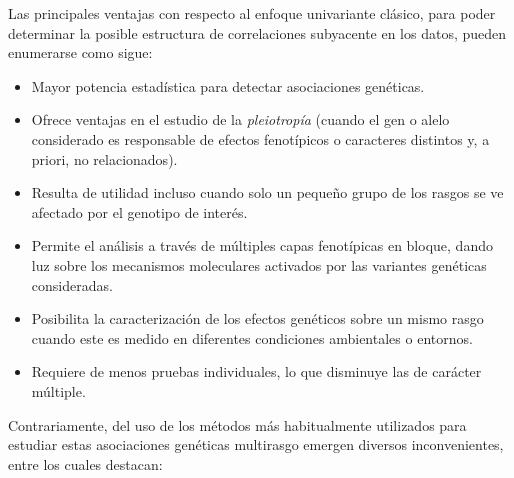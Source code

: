\documentclass[IB,BIB]{TFUOC}%
\let\oldgls=\gls
\renewcommand{\gls}[1]{{\hypersetup{linkcolor=[RGB]{0,0,0}}
  \oldgls{#1}}}
\begin{document}
Las principales ventajas con respecto al enfoque univariante clásico, para poder determinar la posible estructura de correlaciones subyacente en los datos, pueden enumerarse como sigue:

{\small
\begin{itemize}
    \item Mayor potencia estadística para detectar asociaciones genéticas.
    \item Ofrece ventajas en el estudio de la \hspace{-.25em}\textit{\gls{pleiotropía}} (cuando el gen o alelo considerado es responsable de efectos fenotípicos o caracteres distintos y, a priori, no relacionados).
    \item Resulta de utilidad incluso cuando solo un pequeño grupo de los rasgos se ve afectado por el genotipo de interés.
    \item Permite el análisis a través de múltiples capas fenotípicas en bloque, dando luz sobre los mecanismos moleculares activados por las variantes genéticas consideradas.
    \item Posibilita la caracterización de los efectos genéticos sobre un mismo rasgo cuando este es medido en diferentes condiciones ambientales o entornos.
    \item Requiere de menos pruebas individuales, lo que disminuye las de carácter múltiple.
\end{itemize}}

Contrariamente, del uso de los métodos más habitualmente utilizados para estudiar estas asociaciones genéticas multirasgo emergen diversos inconvenientes, entre los cuales destacan:
\end{document}
